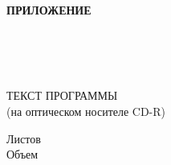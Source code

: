   \begin{flushright}
    \fontsize{16pt}{16pt}\selectfont
    \textbf{ПРИЛОЖЕНИЕ \VarGPRProgramTextAttachmentLetter} \enspace
  \end{flushright}
  
  \begin{center}
    \linespread{1.5}
    \fontsize{16pt}{16pt}\selectfont
    \envDiplomEducation \\
    \fontsize{14.5pt}{16pt}\selectfont
    \envDiplomUniversity \\
    \fontsize{16pt}{16pt}\selectfont
    \vspace{1.5em}
    \envDiplomCathedra \\
  \end{center}

  \vfill

  \begin{center}
    \envDiplomTitleUppercased
  \end{center}


  \begin{center}
    ТЕКСТ ПРОГРАММЫ \\
    (на оптическом носителе CD-R)
  \end{center}

  \begin{center}
    \fontsize{16pt}{16pt}\selectfont
    \textbf{\envCode}
  \end{center}

  \vspace{2.5em}

  \begin{addmargin}[9cm]{0em}
    \fontsize{16pt}{16pt}\selectfont
    Листов \pageref{LastPage} \\
    Объем \envGPRProgramTextSize
  \end{addmargin}

  \vspace{2.5em}

  

  \vfill

  \begin{center}
    \ESKDtheYear
  \end{center}
